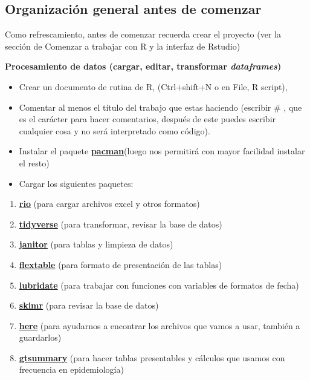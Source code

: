 \documentclass[
  letterpaper,
  DIV=11,
  numbers=noendperiod]{scrreprt}
\begin{document}
\subsection{Organización general antes de
comenzar}\label{organizaciuxf3n-general-antes-de-comenzar}

Como refrescamiento, antes de comenzar recuerda crear el proyecto (ver
la sección de Comenzar a trabajar con R y la interfaz de Rstudio)

\textbf{Procesamiento de datos (cargar, editar, transformar
\emph{dataframes})}

\begin{itemize}
\item
  Crear un documento de rutina de R, (Ctrl+shift+N o en File, R script),
\item
  Comentar al menos el título del trabajo que estas haciendo (escribir
  \# , que es el carácter para hacer comentarios, después de este puedes
  escribir cualquier cosa y no será interpretado como código).
\item
  Instalar el paquete
  \href{http://trinker.github.io/pacman/vignettes/Introduction_to_pacman.html}{\textbf{pacman}}(luego
  nos permitirá con mayor facilidad instalar el resto)
\item
  Cargar los siguientes paquetes:
\end{itemize}

\begin{enumerate}
\def\labelenumi{\arabic{enumi}.}
\item
  \href{https://cran.r-project.org/web/packages/rio/vignettes/rio.html}{\textbf{rio}}
  (para cargar archivos excel y otros formatos)
\item
  \href{https://cran.r-project.org/web/packages/tidyverse/vignettes/paper.html}{\textbf{tidyverse}}
  (para transformar, revisar la base de datos)
\item
  \href{https://cran.r-project.org/web/packages/janitor/vignettes/janitor.html}{\textbf{janitor}}
  (para tablas y limpieza de datos)
\item
  \href{https://cran.r-project.org/web/packages/flextable/index.html}{\textbf{flextable}}
  (para formato de presentación de las tablas)
\item
  \href{https://cran.r-project.org/web/packages/lubridate/vignettes/lubridate.html}{\textbf{lubridate}}
  (para trabajar con funciones con variables de formatos de fecha)
\item
  \href{https://cran.r-project.org/web/packages/skimr/vignettes/skimr.html}{\textbf{skimr}}
  (para revisar la base de datos)
\item
  \href{https://cran.r-project.org/web/packages/here/vignettes/here.html}{\textbf{here}}
  (para ayudarnos a encontrar los archivos que vamos a usar, también a
  guardarlos)
\item
  \href{https://www.danieldsjoberg.com/gtsummary/}{\textbf{gtsummary}}
  (para hacer tablas presentables y cálculos que usamos con frecuencia
  en epidemiología)
\end{enumerate}
\end{document}
